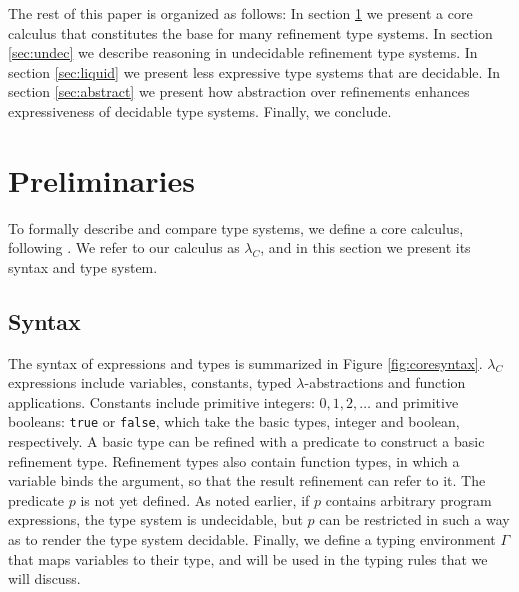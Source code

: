 The rest of this paper is organized as follows:
In section \ref{subsec:formal} we present a core calculus
that constitutes the base for many refinement type systems.
In section \ref{sec:undec}
we describe reasoning in undecidable refinement type systems.
In section \ref{sec:liquid}
we present less expressive type systems
that are decidable.
In section \ref{sec:abstract} 
we present how abstraction over refinements
enhances expressiveness of decidable type systems. 
Finally, we conclude.

\section{Preliminaries}\label{subsec:formal}

To formally describe and compare type systems, 
we define a core calculus, following \cite{flanagan06, LiquidPLDI08, Greenberg12}.
We refer to our calculus as $\lambda_C$, 
and in this section we present its syntax and type system.

\subsection{Syntax}
The syntax of expressions and types is summarized in Figure \ref{fig:coresyntax}.
$\lambda_C$ expressions include variables, constants,
typed $\lambda$-abstractions
and function applications. 
%
Constants include primitive integers:
$0, 1, 2, \dots$ and primitive booleans: \texttt{true} or \texttt{false},
which take the basic types, integer and boolean, respectively.
%
A basic type can be refined with a predicate to construct a basic
refinement type.
Refinement types also contain function types, 
in which 
a variable binds the argument,
so that the result refinement can refer to it.  
%
The predicate $p$ is
not yet defined. 
As noted earlier, if $p$ contains arbitrary program 
expressions, the type system is undecidable, but 
$p$ can be restricted in such a way as to render 
the type system decidable.
%
Finally, we define a typing environment $\Gamma$ that maps variables to their type,
and will be used in the typing rules that we will discuss.


